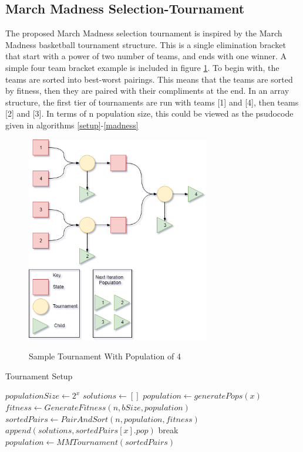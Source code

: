 \documentclass{vgtc}                          %
\begin{document}
\subsection{March Madness Selection-Tournament}
The proposed March Madness selection tournament is inspired by the March Madness basketball tournament structure. This is a single elimination bracket that start with a power of two number of teams, and ends with one winner. A simple four team bracket example is included in figure \ref{fig:Tournament}. To begin with, the teams are sorted into best-worst pairings. This means that the teams are sorted by fitness, then they are paired with their compliments at the end. In an array structure, the first tier of tournaments are run with teams [1] and [4], then teams [2] and [3]. In terms of n population size, this could be viewed as the psudocode given in algorithms \ref{setup}-\ref{madness}

\begin{figure}
  \includegraphics[width=8cm]{Pictures/TournamentFig.png}
  \label{fig:Tournament}
  \caption{Sample Tournament With Population of 4}
\end{figure}

\begin{algorithm}
  \caption{Tournament Setup}\label{setup}
  \begin{algorithmic}[1]
    \State $populationSize \gets 2^x$
    \State $solutions \gets []$
    \State $population \gets \textit{generatePops}(x)$
      \State $fitness \gets GenerateFitness(n,bSize,population)$
      \State $sortedPairs \gets PairAndSort(n,population,fitness)$
          \State $append(solutions,sortedPairs[x].pop)$
         \Else
          \State break
        \EndIf
      \EndFor
      \State $population \gets MMTournament(sortedPairs)$
    \EndWhile
  \EndProcedure
  \end{algorithmic}
\end{algorithm}
\end{document}
